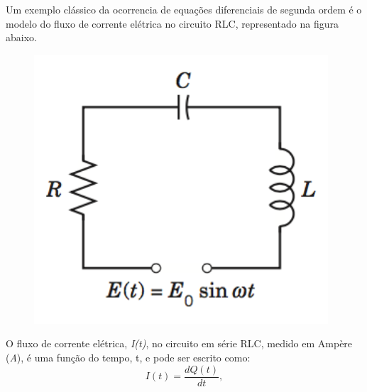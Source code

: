 \linespread{1.5}
Um exemplo clássico da ocorrencia de equações diferenciais de segunda ordem é o modelo do fluxo de corrente elétrica no circuito RLC, representado na figura abaixo.
\begin{figure}[H]
    \centering
    \includegraphics[width=0.5\linewidth]{fig/edo32}
\end{figure}

O fluxo de corrente elétrica, \textit{I(t)}, no circuito em série RLC, medido em Ampère (\textit{A}), é uma função do tempo, t, e pode ser escrito como:
\begin{equation}
    \label{eq:edo321}
    I(t) = \frac{dQ(t)}{dt},
\end{equation}

